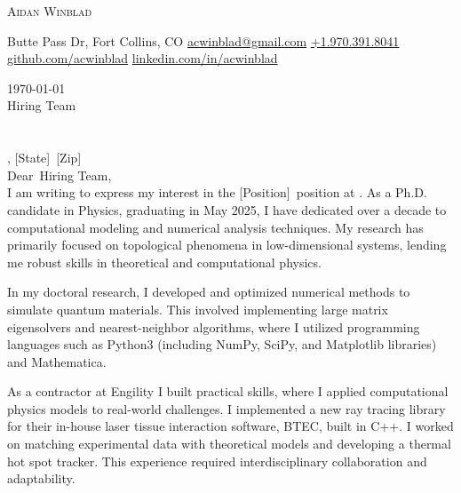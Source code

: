 \documentclass[12pt]{letter}
\makeatletter
\newcommand{\myname}{Aidan Winblad} %
\newcommand{\myemail}{acwinblad@gmail.com} %
\newcommand{\mylinkedin}{acwinblad} %
\newcommand{\mygithub}{acwinblad} %
\newcommand{\myphone}{+1.970.391.8041} %
\newcommand{\mylocation}{1007 Butte Pass Dr, Fort Collins, CO} %
\newcommand{\recipient}{Hiring Team} %
\newcommand{\greeting}{Dear} %
\newcommand{\position}{[Position]} %
\newcommand{\company}{} %
\newcommand{\street}{[Address]} %
\newcommand{\city}{[City]} %
\newcommand{\state}{[State]} %
\newcommand{\zip}{[Zip]} %
\makeatother
\begin{document}
\AddToShipoutPictureBG{%
\color{gr}
\AtPageUpperLeft{\rule[-1.4in]{\paperwidth}{1.3in}}
}

\begin{center}
{\fontsize{28}{0}\selectfont\scshape \myname}

\faMapMarker\enspace\mylocation\hfill
\href{mailto:\myemail}{\faEnvelope\enspace \myemail}\hfill
\href{tel:\myphone}{\faPhone\enspace \myphone}\hfill
\href{https://github.com/\mygithub}{\faGithubSquare\enspace github.com/\mygithub}\hfill
\href{https://linkedin.com/in/\mylinkedin}{\faLinkedinIn\enspace linkedin.com/in/\mylinkedin}\hfill
\end{center}

\vspace{0.2in}

\today\\

\vspace{-0.1in}\recipient\\
\company\\
\street\\
\city, \state\ \zip\\

\vspace{-0.1in}\greeting\ \recipient,\\

\vspace{-0.1in}\setlength\parindent{24pt}
I am writing to express my interest in the \position\ position at \company.
As a Ph.D. candidate in Physics, graduating in May 2025, I have dedicated over a decade to computational modeling and numerical analysis techniques.
My research has primarily focused on topological phenomena in low-dimensional systems, lending me robust skills in theoretical and computational physics.

In my doctoral research, I developed and optimized numerical methods to simulate quantum materials.
This involved implementing large matrix eigensolvers and nearest-neighbor algorithms, where I utilized programming languages such as Python3 (including NumPy, SciPy, and Matplotlib libraries) and Mathematica.

As a contractor at Engility I built practical skills, where I applied computational physics models to real-world challenges.
I implemented a new ray tracing library for their in-house laser tissue interaction software, BTEC, built in C++.
I worked on matching experimental data with theoretical models and developing a thermal hot spot tracker.
This experience required interdisciplinary collaboration and adaptability.
\end{document}
